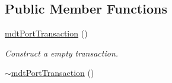 \subsection*{Public Member Functions}
\begin{DoxyCompactItemize}
\item 
\hyperlink{classmdt_port_transaction_ad1ad236620299408bb3c5b6f573ea6ba}{mdtPortTransaction} ()
\begin{DoxyCompactList}\small\item\em Construct a empty transaction. \end{DoxyCompactList}\item 
\hypertarget{classmdt_port_transaction_ae20476e75c2ab1997ddfb82c1bac5549}{
\hyperlink{classmdt_port_transaction_ae20476e75c2ab1997ddfb82c1bac5549}{$\sim$mdtPortTransaction} ()}
\label{classmdt_port_transaction_ae20476e75c2ab1997ddfb82c1bac5549}


\end{DoxyCompactItemize}

